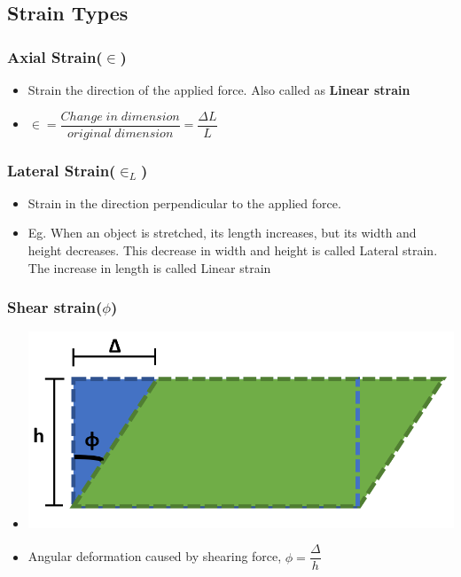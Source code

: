 \documentclass[8pt]{report}
\begin{document}
		\subsection{Strain Types}
			\subsubsection{Axial Strain($\in$)}
				\begin{itemize}
					\item Strain the direction of the applied force. Also called as \textbf{Linear strain}
					\item $\boxed{\in = \dfrac{Change\;in\;dimension}{original\;dimension} = \dfrac{\Delta L}{L}}$
				\end{itemize}\hrulefill
			\subsubsection{Lateral Strain($\in_L$)}
				\begin{itemize}
					\item Strain in the direction perpendicular to the applied force. 
					\item Eg. When an object is stretched, its length increases, but its width and height decreases. This decrease in width and height is called Lateral strain. The increase in length is called Linear strain
				\end{itemize}\hrulefill
			\subsubsection{Shear strain($\phi$)}
				\begin{itemize}
					\item[] \includegraphics[scale=0.3]{shearstrain.png}
					\item Angular deformation caused by shearing force, $\boxed{\phi = \dfrac{\Delta}{h}}$ 
				\end{itemize}\hrulefill
\end{document}
